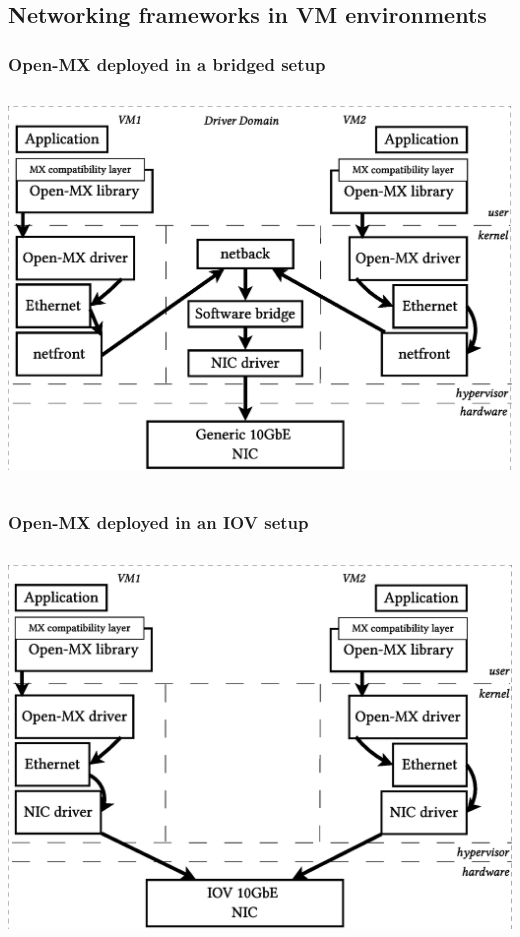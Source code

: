 \documentclass[red,slidestop,notes,compress,mathserif]{beamer}
\begin{document}
\subsection{Networking frameworks in VM environments}
\begin{frame}
\frametitle{Open-MX deployed in a bridged setup}
\begin{columns}
\includegraphics[width=\textwidth]{figs/bare/open-mx-xen.eps}
\end{columns}
\end{frame}
\begin{frame}

\frametitle{Open-MX deployed in an IOV setup}
\begin{columns}
\includegraphics[width=\textwidth]{figs/bare/open-mx-iov.eps}
\end{columns}
\end{frame}
\end{document}
